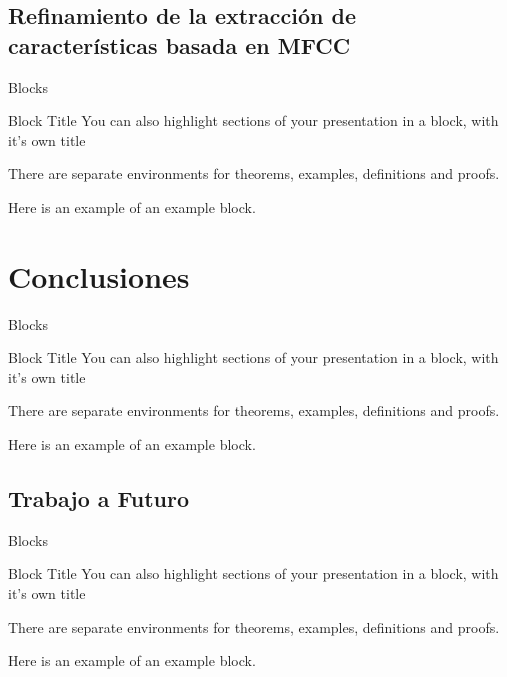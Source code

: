 \documentclass[aspectratio=169]{beamer}
\begin{document}
\subsection{Refinamiento de la extracción de características basada en MFCC}

\begin{frame}{Blocks}
\begin{block}{Block Title}
You can also highlight sections of your presentation in a block, with it's own title
\end{block}
\begin{theorem}
There are separate environments for theorems, examples, definitions and proofs.
\end{theorem}
\begin{example}
Here is an example of an example block.
\end{example}
\end{frame}

\section{Conclusiones}

\begin{frame}{Blocks}
\begin{block}{Block Title}
You can also highlight sections of your presentation in a block, with it's own title
\end{block}
\begin{theorem}
There are separate environments for theorems, examples, definitions and proofs.
\end{theorem}
\begin{example}
Here is an example of an example block.
\end{example}
\end{frame}

\subsection{Trabajo a Futuro}

\begin{frame}{Blocks}
\begin{block}{Block Title}
You can also highlight sections of your presentation in a block, with it's own title
\end{block}
\begin{theorem}
There are separate environments for theorems, examples, definitions and proofs.
\end{theorem}
\begin{example}
Here is an example of an example block.
\end{example}
\end{frame}
\end{document}
